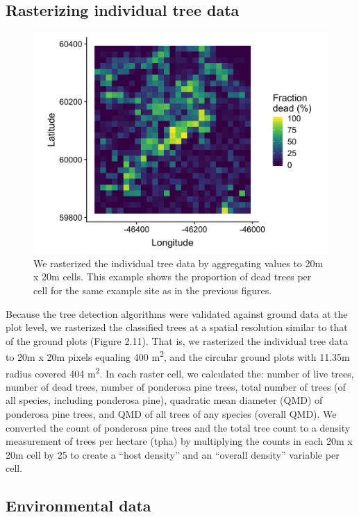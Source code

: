 \documentclass[twoside,12pt,final]{ucthesis-CA2012}
\begin{document}
\begin{ucmainmatter}
\subsection{Rasterizing individual tree
data}\label{rasterizing-individual-tree-data}
\begin{figure}
\centering
\includegraphics[width=6.00000in]{figure/chap02/proportion-dead-rasterized.png}
\caption{We rasterized the individual tree data by aggregating values to
20m x 20m cells. This example shows the proportion of dead trees per
cell for the same example site as in the previous figures.}
\end{figure}
Because the tree detection algorithms were validated against ground data
at the plot level, we rasterized the classified trees at a spatial
resolution similar to that of the ground plots (Figure 2.11). That is,
we rasterized the individual tree data to 20m x 20m pixels equaling 400
m\textsuperscript{2}, and the circular ground plots with 11.35m radius
covered 404 m\textsuperscript{2}. In each raster cell, we calculated
the: number of live trees, number of dead trees, number of ponderosa
pine trees, total number of trees (of all species, including ponderosa
pine), quadratic mean diameter (QMD) of ponderosa pine trees, and QMD of
all trees of any species (overall QMD). We converted the count of
ponderosa pine trees and the total tree count to a density measurement
of trees per hectare (tpha) by multiplying the counts in each 20m x 20m
cell by 25 to create a ``host density'' and an ``overall density''
variable per cell.

\subsection{Environmental data}\label{environmental-data}


\end{ucmainmatter}
\end{document}
